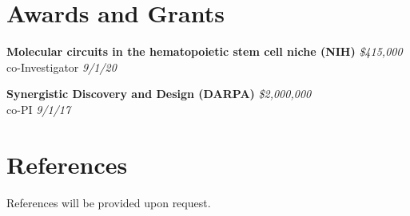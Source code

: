 \documentclass[11pt, a4paper]{awesome-cv}
\begin{document}
\section{Awards and Grants}\label{awards-and-grants}

\textbf{{Molecular circuits in the hematopoietic stem cell niche (NIH)}}
\hfill \emph{\$415,000}\\
co-Investigator \hfill \emph{9/1/20}

\textbf{{Synergistic Discovery and Design (DARPA)}}
\hfill \emph{\$2,000,000}\\
co-PI \hfill \emph{9/1/17}

\section{References}\label{references}

References will be provided upon request.
\end{document}
